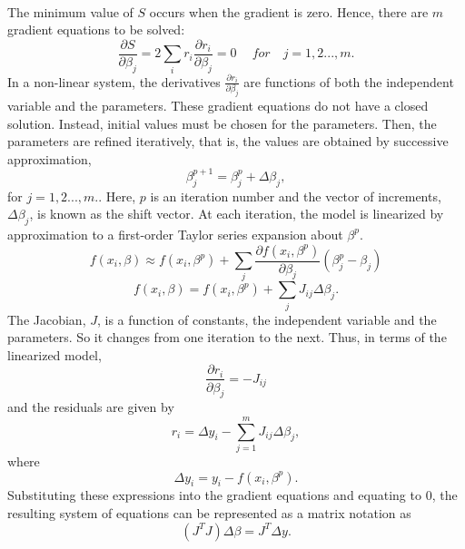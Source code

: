 \documentclass[a4paper,10pt]{report}
\begin{document}
\paragraph*{}
The minimum value of $S$ occurs when the gradient is zero. Hence, there are $m$ gradient equations to be solved:
\begin{equation}
    \frac{\partial S}{\partial \beta_j}=2\sum_i r_i\frac{\partial r_i}{\partial \beta_j}=0 \ \quad for \quad j=1,2...,m.
\end{equation}
In a non-linear system, the derivatives $\frac{\partial r_i}{\partial \beta_j}$ are functions of both the independent variable and the parameters. These gradient equations do not have a closed solution. Instead, initial values must be chosen for the
parameters. Then, the parameters are refined iteratively, that is, the values are obtained by successive approximation,
\begin{equation}
    \beta_j^{p+1}=\beta^p_j+\Delta \beta_j,
\end{equation}
for $j=1,2...,m.$. Here, $p$ is an iteration number and the vector of increments, $\Delta \beta_j$, is known as the shift vector. At each iteration, the model is linearized by approximation to a first-order Taylor series expansion about $\beta^p$.
\begin{equation}
    f(x_i,\beta)\approx f(x_i,\beta^p) +\sum_j \frac{\partial f(x_i, \beta^p)}{\partial \beta_j} \left(\beta^p_j -\beta_j \right)
\end{equation}
\begin{equation}
 f(x_i,\beta) =f(x_i, \beta^p)+\sum_j J_{ij} \Delta\beta_j.
\end{equation}
The Jacobian, $J$, is a function of constants, the independent variable and the parameters. So it changes from one iteration to the
next. Thus, in terms of the linearized model,
\begin{equation}
\frac{\partial r_i}{\partial \beta_j}=-J_{ij}
\end{equation}
and the residuals are given by
\begin{equation}
    r_i=\Delta y_i- \sum_{j=1}^{m} J_{ij}\Delta\beta_j,
\end{equation}
where
\begin{equation}
 \Delta y_i=y_i- f(x_i, \beta^p).
\end{equation}
Substituting these expressions into the gradient equations and equating to $0$, the resulting system of equations can be represented as a matrix notation as 
\begin{equation}
    \left(J^TJ\right)\Delta  \beta=J^T\Delta y.
\end{equation}
\end{document}
